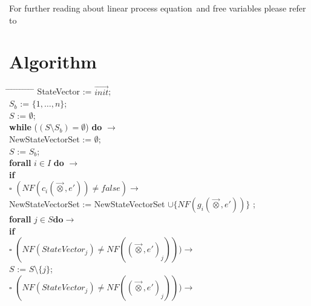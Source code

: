 \documentclass[a4paper,10pt]{article}
\theoremstyle{plain}
\theoremstyle{definition}
\newcommand{\lpe}{linear process equation}
\newcommand{\ovr}{\overrightarrow}
\newcommand{\tb}{\textbf}
\newcommand{\ra}{$\rightarrow$}
\newcommand{\sq}{$\square$}
\begin{document}
For further reading about \lpe\ and free variables please refer to \cite{LPEfreevar} 
\newpage
\section{Algorithm} \label{sec:alg}
\begin{tabbing} 
\hspace*{5.mm} \= \hspace*{5.mm} \= \hspace*{5.mm} \= \hspace*{5.mm} \= \hspace*{5.mm} \= \hspace*{5.mm}  \= \hspace*{5.mm}  \= \hspace*{5.mm}  \= \hspace*{5.mm} \= \hspace*{5.mm} \= \hspace*{5.mm}\kill
StateVector := $\ovr{init}$; \\
$S_b$ := $\lbrace 1, \ldots, n \rbrace$; \\
$S$ := $\emptyset$;\\ 
\tb{while}  ($ (S \setminus S_b) = \emptyset $) \tb{do} \ra \\
  \> NewStateVectorSet := $\emptyset$;\\
  \> $S$ := $S_b$; \\
  \> \tb{forall} $i \in I$ \tb{do} \ra \\
  \>	\>	\tb{if} \\
  \>	\>	\sq \> $(NF(c_i(\ovr{\otimes},e')) \not= false) \rightarrow$ \\
  \>	\>	\> 	\>NewStateVectorSet := NewStateVectorSet $\cup \lbrace NF(g_i(\ovr{\otimes},e')) \rbrace$ ;\\  
  \>	\>	\>  	\>  \tb{forall} $j \in S \tb{do} \rightarrow$ \\
  \>	\>	\>  	\>	\>  	    \tb{if} \\
  \>	\>	\>  	\>   	\>         $\square$  \> $(NF(StateVector_j) \neq NF((\ovr{\otimes}, e')_j))) \rightarrow$ \\
  \>	\>	\>  	\>    	\>       \>    \>            $S$ := $S\setminus \lbrace j \rbrace$;\\
  \>	\>	\>  	\>    	\>        $\square$ \> $ (NF(StateVector_j) \neq NF((\ovr{\otimes}, e')_j))) \rightarrow$\\

\end{tabbing}
\end{document}
